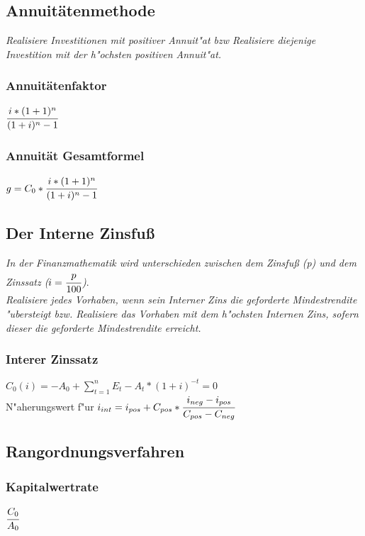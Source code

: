 \documentclass[a4paper,12pt]{scrartcl}
\begin{document}
\subsection{Annuitätenmethode}
\textit{Realisiere Investitionen mit positiver Annuit"at bzw Realisiere diejenige Investition mit der h"ochsten positiven Annuit"at.}
\subsubsection{Annuitätenfaktor}
$\cfrac{i * (1+1)^n}{(1+i)^n -1}$
\subsubsection{Annuität Gesamtformel}
$ g = C_0 * \cfrac{i * (1+1)^n}{(1+i)^n -1}$

\subsection{Der Interne Zinsfuß}
\textit{In der Finanzmathematik wird unterschieden zwischen dem Zinsfuß (p) und dem Zinssatz ($i=\cfrac{p}{100}$)}. \\
\textit{Realisiere jedes Vorhaben, wenn sein Interner Zins die geforderte Mindestrendite "ubersteigt bzw. Realisiere das Vorhaben mit dem h"ochsten Internen Zins, sofern dieser die geforderte Mindestrendite erreicht.}

\subsubsection{Interer Zinssatz}
$C_0(i) = -A_0 + \displaystyle\sum_{t=1}^{n} E_t - A_t * (1+i)^{-t} = 0$
\\
N"aherungswert f"ur $i_{int} = i_{pos} + C_{pos} * \cfrac{i_{neg} - i_{pos}}{C_{pos} - C_{neg}}$

\subsection{Rangordnungsverfahren}
\subsubsection{Kapitalwertrate}
$\cfrac{C_0}{A_0}$
\end{document}
